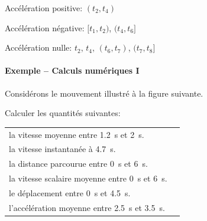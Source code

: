 Accélération positive: $(t_2, t_4)$

Accélération négative: $[t_1, t_2)$, $(t_4, t_6]$

Accélération nulle: $t_2$, $t_4$, $(t_6, t_7)$, $(t_7, t_8]$


\paragraph{Exemple -- Calculs numériques I}
Considérons le mouvement illustré à la figure suivante.

\begin{center}
\end{center}

Calculer les quantités suivantes:

\begin{tabular}{ll}
  la vitesse moyenne entre \SI{1,2}{\second} et \SI{2}{\second}.
  & \color{blue}{$v_{\mathrm{moy},x} = \SI{-1.00}{\meter\per\second}$} \\

  la vitesse instantanée à \SI{4.7}{\second}.
  & \color{blue}{$v_x = \SI{2.00}{\meter\per\second}$} \\

  la distance parcourue entre \SI{0}{\second} et \SI{6}{\second}.
  & \color{blue}{$d = \SI{4.00}{\meter}$} \\

  la vitesse scalaire moyenne entre \SI{0}{\second} et \SI{6}{\second}.
  & \color{blue}{$v_s = \SI{0.667}{\meter\per\second}$} \\

  le déplacement entre \SI{0}{\second} et \SI{4.5}{\second}.
  & \color{blue}{$\Delta x = \SI{-1.00}{\meter}$} \\

  l'accélération moyenne entre \SI{2.5}{\second} et \SI{3.5}{\second}.
  & \color{blue}{$a_{\mathrm{moy}, x} = \SI{1.00}{\meter\per\second\squared}$} \\
\end{tabular}


